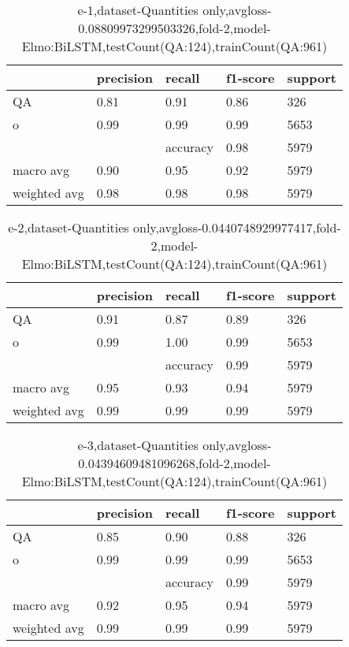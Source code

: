 \begin{table}[!ht] 
\centering
\caption{e-1,dataset-Quantities only,avgloss-0.08809973299503326,fold-2,model-Elmo:BiLSTM,testCount(QA:124),trainCount(QA:961)}\label{e-1data-quantS.tsv}
\begin{tabularx}{300pt}{|X|X|X|X|X|}
\hline
&precision&recall&f1-score&support\\
\hline
QA&0.81&0.91&0.86&326\\
\hline
o&0.99&0.99&0.99&5653\\
\hline
&&accuracy&0.98&5979\\
\hline
macro avg&0.90&0.95&0.92&5979\\
\hline
weighted avg&0.98&0.98&0.98&5979\\
\hline
\end{tabularx}
\end{table}
\begin{table}[!ht] 
\centering
\caption{e-2,dataset-Quantities only,avgloss-0.0440748929977417,fold-2,model-Elmo:BiLSTM,testCount(QA:124),trainCount(QA:961)}\label{e-2data-quantS.tsv}
\begin{tabularx}{300pt}{|X|X|X|X|X|}
\hline
&precision&recall&f1-score&support\\
\hline
QA&0.91&0.87&0.89&326\\
\hline
o&0.99&1.00&0.99&5653\\
\hline
&&accuracy&0.99&5979\\
\hline
macro avg&0.95&0.93&0.94&5979\\
\hline
weighted avg&0.99&0.99&0.99&5979\\
\hline
\end{tabularx}
\end{table}
\begin{table}[!ht] 
\centering
\caption{e-3,dataset-Quantities only,avgloss-0.04394609481096268,fold-2,model-Elmo:BiLSTM,testCount(QA:124),trainCount(QA:961)}\label{e-3data-quantS.tsv}
\begin{tabularx}{300pt}{|X|X|X|X|X|}
\hline
&precision&recall&f1-score&support\\
\hline
QA&0.85&0.90&0.88&326\\
\hline
o&0.99&0.99&0.99&5653\\
\hline
&&accuracy&0.99&5979\\
\hline
macro avg&0.92&0.95&0.94&5979\\
\hline
weighted avg&0.99&0.99&0.99&5979\\
\hline
\end{tabularx}
\end{table}
